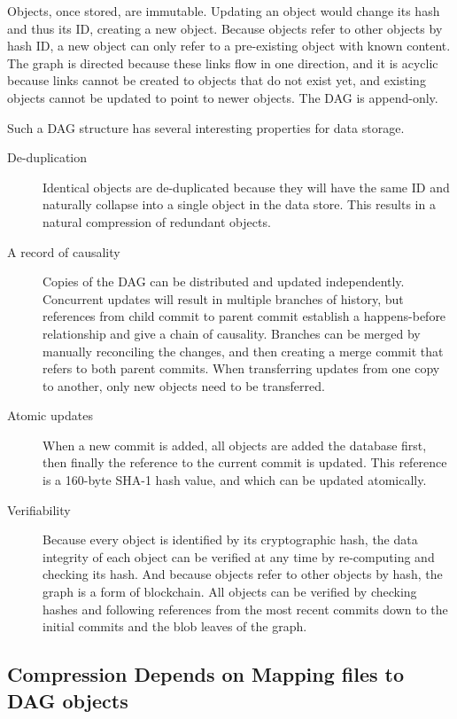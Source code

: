 Objects, once stored, are immutable.
Updating an object would change its hash and thus its ID, creating a new object.
Because objects refer to other objects by hash ID, a new object can only refer to a pre-existing object with known content.
The graph is directed because these links flow in one direction, and it is acyclic because links cannot be created to objects that do not exist yet, and existing objects cannot be updated to point to newer objects.
The DAG is append-only.

Such a DAG structure has several interesting properties for data storage.
\begin{description}
    \item[De-duplication]
        Identical objects are de-duplicated because they will have the same ID and naturally collapse into a single object in the data store.
        This results in a natural compression of redundant objects.
    \item[A record of causality]
        Copies of the DAG can be distributed and updated independently.
        Concurrent updates will result in multiple branches of history, but references from child commit to parent commit establish a happens-before relationship and give a chain of causality.
        Branches can be merged by manually reconciling the changes, and then creating a merge commit that refers to both parent commits.
        When transferring updates from one copy to another, only new objects need to be transferred.
    \item[Atomic updates]
        When a new commit is added, all objects are added the database first, then finally the reference to the current commit is updated.
        This reference is a 160-byte SHA-1 hash value, and which can be updated atomically.
    \item[Verifiability]
        Because every object is identified by its cryptographic hash, the data integrity of each object can be verified at any time by re-computing and checking its hash.
        And because objects refer to other objects by hash, the graph is a form of blockchain.
        All objects can be verified by checking hashes and following references from the most recent commits down to the initial commits and the blob leaves of the graph.
\end{description}


\subsection{Compression Depends on Mapping files to DAG objects}

